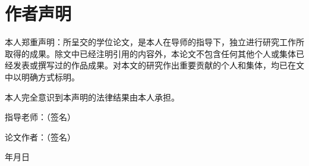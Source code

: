 \chapter*{作者声明}
\thispagestyle{empty}
\vspace{2em}
本人郑重声明：所呈交的学位论文，是本人在导师的指导下，独立进行研究工作所取得的成果。除文中已经注明引用的内容外，本论文不包含任何其他个人或集体已经发表或撰写过的作品成果。对本文的研究作出重要贡献的个人和集体，均已在文中以明确方式标明。

本人完全意识到本声明的法律结果由本人承担。
\vspace{2em}
{}

\hfill 指导老师：\uline{\makebox[6em][l]{}}（签名）
\vspace{1em}

\hfill 论文作者：\uline{\makebox[6em][l]{}}（签名）
\vspace{1em}

\hfill 年\qquad 月\qquad 日
\normalsize

\newpage
\thispagestyle{empty}